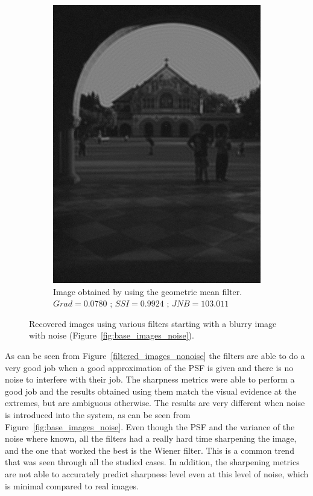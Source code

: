 \begin{figure}[H]
\begin{subfigure}[b]{0.35\textwidth}
                         \includegraphics[width=\textwidth]{memchu_geo_noise.jpg}
                         \caption{Image obtained by using the geometric mean filter.\newline $Grad=0.0780$ ; $SSI=0.9924$ ; $JNB=103.011$}
        \end{subfigure} 
        
        \caption{Recovered images using various filters starting with a blurry image with noise (Figure~\ref{fig:base_images_noise}).}
        \label{filtered_images_noise}
\end{figure}

As can be seen from Figure~\ref{filtered_images_nonoise} the filters are able to do a very good job when a good approximation of the PSF is given and there is no noise to interfere with their job. The sharpness metrics were able to perform a good job and the results obtained using them match the visual evidence at the extremes, but are ambiguous otherwise.
The results are very different when noise is introduced into the system, as can be seen from Figure~\ref{fig:base_images_noise}. Even though the PSF and the variance of the noise where known, all the filters had a really hard time sharpening the image, and the one that worked the best is the Wiener filter. This is a common trend that was seen through all the studied cases. In addition, the sharpening metrics are not able to accurately predict sharpness level even at this level of noise, which is minimal compared to real images.

\newpage